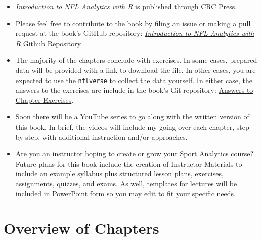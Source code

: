 \documentclass[
  letterpaper,
]{krantz}
\begin{document}
\begin{itemize}
\item
  \emph{Introduction to NFL Analytics with R} is published through CRC
  Press.
\item
  Please feel free to contribute to the book by filing an issue or
  making a pull request at the book's GitHub repository:
  \href{https://github.com/bcongelio/nfl-analytics-with-r-book}{\emph{Introduction
  to NFL Analytics with R} Github Repository}
\item
  The majority of the chapters conclude with exercises. In some cases,
  prepared data will be provided with a link to download the file. In
  other cases, you are expected to use the \texttt{nflverse} to collect
  the data yourself. In either case, the answers to the exercises are
  include in the book's Git repository:
  \href{http://nfl-book.bradcongelio.com/ex-answers}{Answers to Chapter
  Exercises}.
\item
  Soon there will be a YouTube series to go along with the written
  version of this book. In brief, the videos will include my going over
  each chapter, step-by-step, with additional instruction and/or
  approaches.
\item
  Are you an instructor hoping to create or grow your Sport Analytics
  course? Future plans for this book include the creation of Instructor
  Materials to include an example syllabus plus structured lesson plans,
  exercises, assignments, quizzes, and exams. As well, templates for
  lectures will be included in PowerPoint form so you may edit to fit
  your specific needs.
\end{itemize}

\hypertarget{overview-of-chapters}{%
\section{Overview of Chapters}\label{overview-of-chapters}}
\end{document}
